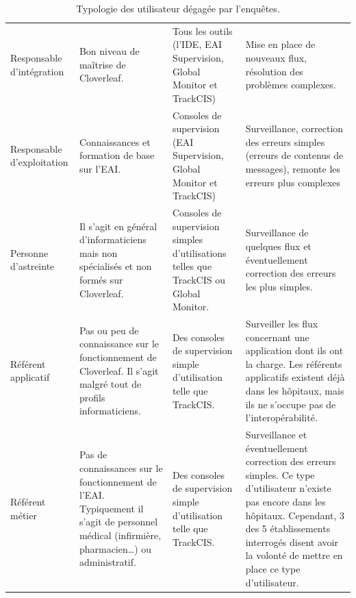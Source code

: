 			\begin{table}[H]
				\centering
				\caption{\label{type_utilisateurs} Typologie des utilisateur dégagée par
				l'enquêtes.}
				\begin{tabular}{| p{3cm} | p{4cm} | p{4,5cm} | p{} |} %
					\hline
						\thead{Utilisateur}
						&\thead{Niveau de maitrise}
						&\thead{Outils utilisés}
						&\thead{Rôles}
						\\
					\hline
						Responsable d'intégration
						&
						Bon niveau de maîtrise de Cloverleaf.
						&
						Tous les outils (l'IDE, EAI Supervision, Global Monitor et TrackCIS)
						&
						Mise en place de nouveaux flux, résolution des problèmes complexes.
						\\
					\hline
						Responsable d'exploitation
						&
						Connaissances et formation de base sur l’EAI.
						&
						Consoles de supervision (EAI Supervision, Global Monitor et TrackCIS)
						&
						Surveillance, correction des erreurs simples (erreurs de contenus de
						messages), remonte les erreurs plus complexes
						\\
					\hline
						Personne d'astreinte
						&
						Il s'agit en général d'informaticiens mais non spécialisés et non formés
						sur Cloverleaf.
						&
						Consoles de supervision simples d'utilisations telles que TrackCIS ou
						Global Monitor.
						&
						Surveillance de quelques flux et éventuellement correction des erreurs les
						plus simples.
						\\
					\hline
						Référent applicatif
						&
						Pas ou peu de connaissance sur le fonctionnement de Cloverleaf. Il s'agit
						malgré tout de profils informaticiens.
						&
						Des consoles de supervision simple d'utilisation telle que TrackCIS.
						&
						Surveiller les flux concernant une application dont ils ont la charge. Les
						référents applicatifs existent déjà dans les hôpitaux, mais ils ne
						s'occupe pas de l'interopérabilité.
						\\
					\hline
						Référent métier
						&
						Pas de connaissances sur le fonctionnement de l’EAI. Typiquement il s'agit
						de personnel médical (infirmière, pharmacien\ldots) ou administratif.
						&
						Des consoles de supervision simple d'utilisation telle que TrackCIS.
						&
						Surveillance et éventuellement correction des erreurs simples. Ce type
						d'utilisateur n'existe pas encore dans les hôpitaux. Cependant, 3 des 5
						établissements interrogés disent avoir la volonté de mettre en place ce
						type d'utilisateur.
						\\
					\hline
				\end{tabular}
			\end{table}
